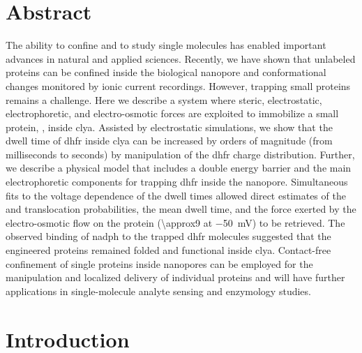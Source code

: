 %
\section{Abstract}
%
\label{sec:trapping:abstract}
%

The ability to confine and to study single molecules has enabled important advances in natural and applied
sciences. Recently, we have shown that unlabeled proteins can be confined inside the biological nanopore
 and conformational changes monitored by ionic current recordings. However, trapping small
proteins remains a challenge. Here we describe a system where steric, electrostatic, electrophoretic, and
electro-osmotic forces are exploited to immobilize a small protein, , inside \gls{clya}.
Assisted by electrostatic simulations, we show that the dwell time of \gls{dhfr} inside \gls{clya} can be
increased by orders of magnitude (from milliseconds to seconds) by manipulation of the \gls{dhfr} charge
distribution. Further, we describe a physical model that includes a double energy barrier and the main
electrophoretic components for trapping \gls{dhfr} inside the nanopore. Simultaneous fits to the voltage
dependence of the dwell times allowed direct estimates of the \cisi{} and \transi{} translocation
probabilities, the mean dwell time, and the force exerted by the electro-osmotic flow on the protein
(\SI{\approx9}{\pN} at \SI{-50}{\mV}) to be retrieved. The observed binding of \gls{nadph} to the trapped
\gls{dhfr} molecules suggested that the engineered proteins remained folded and functional inside \gls{clya}.
Contact-free confinement of single proteins inside nanopores can be employed for the manipulation and
localized delivery of individual proteins and will have further applications in single-molecule analyte
sensing and enzymology studies.


%
\section{Introduction}
%
\label{sec:trapping:intro}
%

